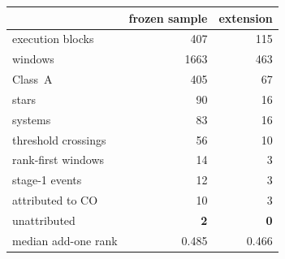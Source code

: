 \begin{tabular}{@{}lrr@{}}
\toprule
 & frozen sample & extension \\
\midrule
execution blocks & 407 & 115 \\
windows & 1663 & 463 \\
\quad Class~A & 405 & 67 \\
stars & 90 & 16 \\
systems & 83 & 16 \\
\midrule
threshold crossings & 56 & 10 \\
rank-first windows & 14 & 3 \\
stage-1 events & 12 & 3 \\
\quad attributed to CO & 10 & 3 \\
\quad unattributed & \textbf{2} & \textbf{0} \\
\midrule
median add-one rank & 0.485 & 0.466 \\
\bottomrule
\end{tabular}
